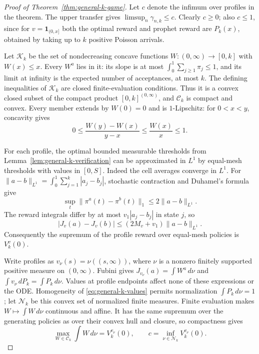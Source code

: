 \documentclass[11pt]{article}
\theoremstyle{remark}
\begin{document}
\begin{proof}[Proof of Theorem~\ref{thm:general-k-game}]
Let $c$ denote the infimum over profiles in the theorem. The upper
transfer gives $\limsup_n\gamma_{n,k}\le c$. Clearly $c\ge0$;
also $c\le1$, since for $v=\mathbf1_{(0,x]}$ both the optimal reward
and prophet reward are $P_k(x)$, obtained by taking up to $k$ positive
Poisson arrivals.

Let $\mathcal K_k$ be the set of nondecreasing concave functions
$W:(0,\infty)\to[0,k]$ with $W(x)\le x$. Every $W^a$ lies in it:
its slope is at most $\int_0^1\sum_{j\ge1}\pi_j\le1$, and its
limit at infinity is the expected number of acceptances, at most $k$.
The defining inequalities of $\mathcal K_k$ are closed finite-evaluation
conditions. Thus it is a convex closed subset of the compact product
$[0,k]^{(0,\infty)}$, and $\mathcal C_k$ is compact and convex.
Every member extends by $W(0)=0$ and is $1$-Lipschitz: for $0<x<y$,
concavity gives
\[
 0\le\frac{W(y)-W(x)}{y-x}\le\frac{W(x)}x\le1.
\]

For each profile, the optimal bounded measurable thresholds from
Lemma~\ref{lem:general-k-verification} can be approximated in $L^1$
by equal-mesh thresholds with values in $[0,S]$. Indeed the cell
averages converge in $L^1$. For
$\|a-b\|_{L^1}=\int_0^1\sum_{j=1}^k|a_j-b_j|$, stochastic
contraction and Duhamel's formula give
\[
 \sup_t\|\pi^a(t)-\pi^b(t)\|_1\le2\|a-b\|_{L^1}.
\]
The reward integrals differ by at most $v_1|a_j-b_j|$ in state $j$,
so
\[
 |J_v(a)-J_v(b)|\le(2M_v+v_1)\|a-b\|_{L^1}.
\]
Consequently the supremum of the profile reward over equal-mesh
policies is $V_k^v(0)$.

Write profiles as $v_\nu(s)=\nu((s,\infty))$, where $\nu$ is a
nonzero finitely supported positive measure on $(0,\infty)$.
Fubini gives $J_{v_\nu}(a)=\int W^a\,d\nu$ and
$\int v_\nu\,dP_k=\int P_k\,d\nu$. Values at profile endpoints
affect none of these expressions or the ODE. Homogeneity of
\eqref{eq:general-k-values} permits normalization
$\int P_k\,d\nu=1$; let $\mathcal N_k$ be this convex set of
normalized finite measures. Finite evaluation makes
$W\mapsto\int W\,d\nu$ continuous and affine. It has the same
supremum over the generating policies as over their convex hull and
closure, so compactness gives
\[
 \max_{W\in\mathcal C_k}\int W\,d\nu=V_k^{v_\nu}(0),
 \qquad c=\inf_{\nu\in\mathcal N_k}V_k^{v_\nu}(0).
\]


\end{proof}
\end{document}
